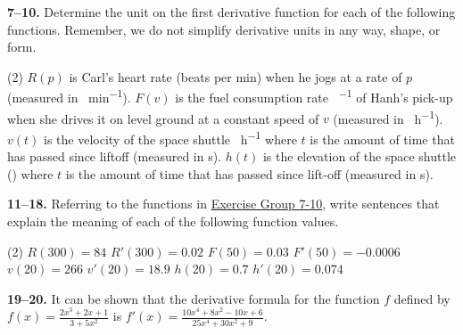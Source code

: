 \documentclass[10pt,oneside,]{book}
\theoremstyle{plain}
\theoremstyle{definition}
\numberwithin{equation}{section}
\newcommand{\fe}[2]{#1\mathopen{}\left(#2\right)\mathclose{}}
\newcommand{\fd}[1]{#1'}
\begin{document}
\par\smallskip\noindent
\textbf{7--10. }\hypertarget{exercisegroup-derivative-units-supplement}{\null}Determine the unit on the first derivative function for each of the following functions.  Remember, we do not simplify derivative units in any way, shape, or form.%
\par
\begin{exercisegroup}(2)
\exercise[7.]\hypertarget{exercise-derivative-units-supplement-first}{\null}\(\fe{R}{p}\) is Carl's heart rate (beats per min) when he jogs at a rate of \(p\) (measured in \si{\foot\per\minute}).%
\exercise[8.]\hypertarget{exercise-208}{\null}\(\fe{F}{v}\) is the fuel consumption rate \si{\gallon\per\mile} of Hanh's pick-up when she drives it on level ground at a constant speed of \(v\) (measured in \si{\mile\per\hour}).%
\exercise[9.]\hypertarget{exercise-209}{\null}\(\fe{v}{t}\) is the velocity of the space shuttle  \si{\mile\per\hour} where \(t\) is the amount of time that has passed since liftoff (measured in \si{\second}).%
\exercise[10.]\hypertarget{exercise-derivative-units-supplement-last}{\null}\(\fe{h}{t}\) is the elevation of the space shuttle (\si{\mile}) where \(t\) is the amount of time that has passed since lift-off (measured in \si{\second}).%
\end{exercisegroup}
\par\smallskip\noindent
\textbf{11--18. }\hypertarget{exercisegroup-43}{\null}Referring to the functions in \hyperlink{exercisegroup-derivative-units-supplement}{Exercise Group 7-10}, write sentences that explain the meaning of each of the following function values.%
\par
\begin{exercisegroup}(2)
\exercise[11.]\hypertarget{exercise-211}{\null}\(\fe{R}{300}=84\)%
\exercise[12.]\hypertarget{exercise-212}{\null}\(\fe{\fd{R}}{300}=0.02\)%
\exercise[13.]\hypertarget{exercise-213}{\null}\(\fe{F}{50}=0.03\)%
\exercise[14.]\hypertarget{exercise-214}{\null}\(\fe{\fd{F}}{50}=-0.0006\)%
\exercise[15.]\hypertarget{exercise-215}{\null}\(\fe{v}{20}=266\)%
\exercise[16.]\hypertarget{exercise-216}{\null}\(\fe{\fd{v}}{20}=18.9\)%
\exercise[17.]\hypertarget{exercise-217}{\null}\(\fe{h}{20}=0.7\)%
\exercise[18.]\hypertarget{exercise-218}{\null}\(\fe{\fd{h}}{20}=0.074\)%
\end{exercisegroup}
\par\smallskip\noindent
\textbf{19--20. }\hypertarget{exercisegroup-44}{\null}It can be shown that the derivative formula for the function \(f\) defined by \(\fe{f}{x}=\frac{2x^3+2x+1}{3+5x^2}\) is \(\fe{\fd{f}}{x}=\frac{10x^4+8x^2-10x+6}{25x^4+30x^2+9}\).%
\end{document}
